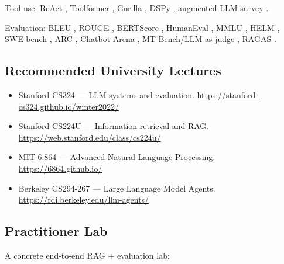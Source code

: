 Tool use: ReAct \citep{yao2023react}, Toolformer
\citep{schick2023toolformer}, Gorilla \citep{patil2023gorilla},
DSPy \citep{khattab2023dspy}, augmented-LLM survey
\citep{mialon2023augmented}.

Evaluation: BLEU \citep{papineni2002bleu}, ROUGE
\citep{lin2004rouge}, BERTScore \citep{zhang2020bertscore},
HumanEval \citep{chen2021humaneval}, MMLU \citep{hendrycks2021mmlu},
HELM \citep{liang2023helm}, SWE-bench \citep{jimenez2024swebench},
ARC \citep{chollet2019arc}, Chatbot Arena \citep{chiang2024arena},
MT-Bench/LLM-as-judge \citep{zheng2023llmjudge},
RAGAS \citep{es2024ragas}.

\subsection{Recommended University Lectures}

\begin{itemize}
  \item Stanford CS324 --- LLM systems and evaluation.
        \url{https://stanford-cs324.github.io/winter2022/}
  \item Stanford CS224U --- Information retrieval and RAG.
        \url{https://web.stanford.edu/class/cs224u/}
  \item MIT 6.864 --- Advanced Natural Language Processing.
        \url{https://6864.github.io/}
  \item Berkeley CS294-267 --- Large Language Model Agents.
        \url{https://rdi.berkeley.edu/llm-agents/}
\end{itemize}

\subsection{Practitioner Lab}

A concrete end-to-end RAG + evaluation lab:


